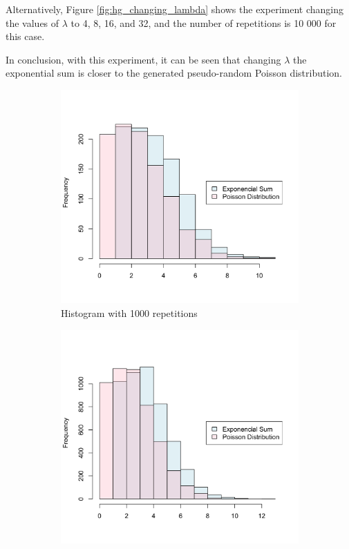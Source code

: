 \documentclass[10pt,leter,openany]{article}
\begin{document}
	 Alternatively, Figure \ref{fig:hg_changing_lambda} shows the experiment changing the values of $\lambda$ to 4, 8, 16, and 32, and the number of repetitions is 10 000 for this case.
	 
	 In conclusion, with this experiment, it can be seen that changing $\lambda$  the exponential sum is closer to the generated pseudo-random Poisson distribution.
	 
	 \begin{figure}
	 	\centering
	 	\begin{subfigure}[b]{0.475\textwidth}
	 		\centering
	 		\includegraphics[width=\textwidth]{extras/hg_changing_reps_1000_3}
	 		\caption[]%
	 		{{\small Histogram with 1000 repetitions}}    
	 		\label{fig:mean and std of net142}
	 	\end{subfigure}
	 	\hfill
	 	\begin{subfigure}[b]{0.475\textwidth}  
	 		\centering 
	 		\includegraphics[width=\textwidth]{extras/hg_changing_reps_5000_3}

\end{subfigure}
\end{figure}
\end{document}
